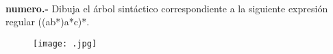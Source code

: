 \paragraph{}
\textbf{{numero}.-} Dibuja el árbol sintáctico correspondiente a la siguiente expresión regular ((a\textbar b*)a*c)*. 
\begin{figure}[ht!]
\centering
\texttt{[image: .jpg]}
\end{figure}